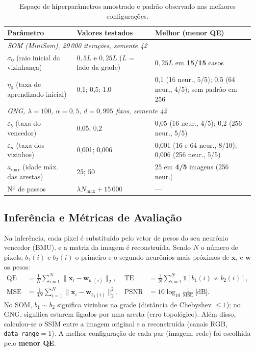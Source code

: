\documentclass[11pt,a4paper]{article}
\begin{document}
\begin{table}[h]
\centering
\small
\caption{Espaço de hiperparâmetros amostrado e padrão observado nas melhores configurações.}
\label{tab:hiper}
\begin{tabularx}{\textwidth}{lXX}
\toprule
\textbf{Parâmetro} & \textbf{Valores testados} & \textbf{Melhor (menor QE)} \\
\midrule
\multicolumn{3}{l}{\textit{SOM (MiniSom), 20\,000 iterações, semente 42}} \\
$\sigma_0$ (raio inicial da vizinhança) & $0{,}5L$ e $0{,}25L$ ($L$ = lado da grade) & $0{,}25L$ em \textbf{15/15} casos \\
$\eta_0$ (taxa de aprendizado inicial) & 0,1; 0,5; 1,0 & 0,1 (16 neur., 5/5); 0,5 (64 neur., 4/5); sem padrão em 256 \\
\midrule
\multicolumn{3}{l}{\textit{GNG, $\lambda=100$, $\alpha=0{,}5$, $d=0{,}995$ fixos, semente 42}} \\
$\varepsilon_b$ (taxa do vencedor) & 0,05; 0,2 & 0,05 (16 neur., 4/5); 0,2 (256 neur., 5/5) \\
$\varepsilon_n$ (taxa dos vizinhos) & 0,001; 0,006 & 0,001 (16 e 64 neur., 8/10); 0,006 (256 neur., 5/5) \\
$a_{\max}$ (idade máx. das arestas) & 25; 50 & 25 em \textbf{4/5} imagens (256 neur.) \\
Nº de passos & $\lambda N_{\max} + 15\,000$ & --- \\
\bottomrule
\end{tabularx}
\end{table}

\subsection{Inferência e Métricas de Avaliação}
Na inferência, cada pixel é substituído pelo vetor de pesos do seu neurônio vencedor (BMU), e a matriz da imagem é reconstruída. Sendo $N$ o número de pixels, $b_1(i)$ e $b_2(i)$ o primeiro e o segundo neurônios mais próximos de $\mathbf{x}_i$ e $\mathbf{w}$ os pesos:
\begin{align}
\mathrm{QE} &= \frac{1}{N}\sum_{i=1}^{N}\lVert \mathbf{x}_i-\mathbf{w}_{b_1(i)}\rVert_2, &
\mathrm{TE} &= \frac{1}{N}\sum_{i=1}^{N}\mathbb{1}\!\left[b_1(i)\not\sim b_2(i)\right],\\
\mathrm{MSE} &= \frac{1}{3N}\sum_{i=1}^{N}\lVert \mathbf{x}_i-\mathbf{w}_{b_1(i)}\rVert_2^2, &
\mathrm{PSNR} &= 10\log_{10}\frac{1}{\mathrm{MSE}}\ \text{[dB]}.
\end{align}
No SOM, $b_1\sim b_2$ significa vizinhos na grade (distância de Chebyshev $\le 1$); no GNG, significa estarem ligados por uma aresta (erro topológico). Além disso, calculou-se o SSIM entre a imagem original e a reconstruída (canais RGB, \texttt{data\_range}$=1$). A melhor configuração de cada par (imagem, rede) foi escolhida pelo \textbf{menor QE}.
\end{document}
